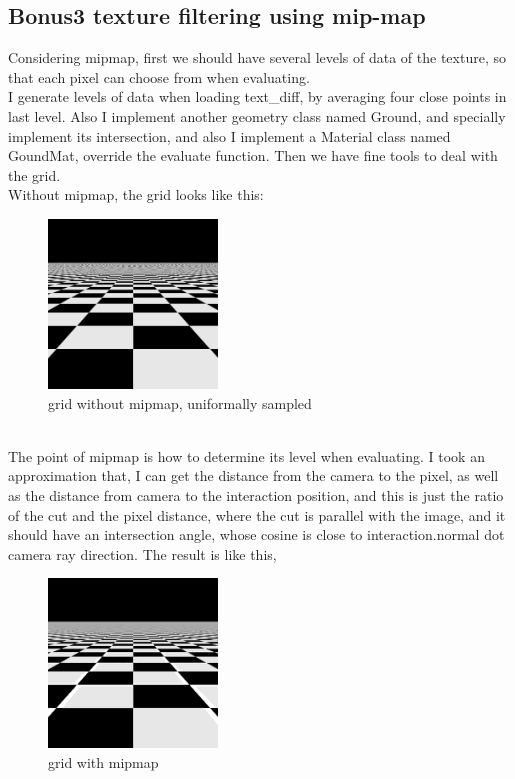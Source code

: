 \documentclass[acmtog]{acmart}
\begin{document}
\subsection{Bonus3 texture filtering using mip-map}
Considering mipmap, first we should have several levels of data of the texture, so that each pixel can choose from when evaluating.\\
I generate levels of data when loading text\_diff, by averaging four close points in last level. Also I implement another geometry class named Ground, and specially implement its intersection, and also I implement a Material class named GoundMat, override the evaluate function.
Then we have fine tools to deal with the grid.\\
Without mipmap, the grid looks like this:
\begin{figure}[h]
	\includegraphics[width=4.5cm,height=4.5cm]{super_resolution_uniform.png}
	\caption{grid without mipmap, uniformally sampled}
\end{figure}\\
The point of mipmap is how to determine its level when evaluating. I took an approximation that, I can get the distance from the camera to the pixel, as well as the distance from camera to the interaction position,
and this is just the ratio of the cut and the pixel distance, where the cut is parallel with the image, and it should have an intersection angle, whose cosine is close to interaction.normal dot camera ray direction.
The result is like this,
\begin{figure}[h]
	\includegraphics[width=4.5cm,height=4.5cm]{mipmap.png}
	\caption{grid with mipmap}
\end{figure}\\
\end{document}

